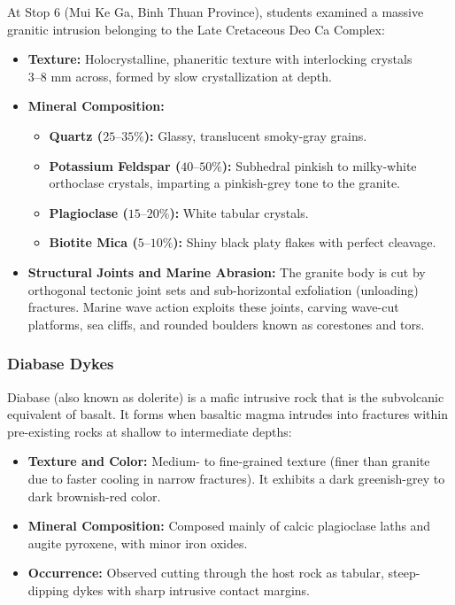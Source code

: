 \documentclass[11pt, a4paper]{article}
\begin{document}
At Stop 6 (Mui Ke Ga, Binh Thuan Province), students examined a massive granitic intrusion belonging to the Late Cretaceous Deo Ca Complex:
\begin{itemize}
    \item \textbf{Texture:} Holocrystalline, phaneritic texture with interlocking crystals $3\text{--}8\text{ mm}$ across, formed by slow crystallization at depth.
    \item \textbf{Mineral Composition:}
    \begin{itemize}
        \item \textbf{Quartz ($25\text{--}35\%$):} Glassy, translucent smoky-gray grains.
        \item \textbf{Potassium Feldspar ($40\text{--}50\%$):} Subhedral pinkish to milky-white orthoclase crystals, imparting a pinkish-grey tone to the granite.
        \item \textbf{Plagioclase ($15\text{--}20\%$):} White tabular crystals.
        \item \textbf{Biotite Mica ($5\text{--}10\%$):} Shiny black platy flakes with perfect cleavage.
    \end{itemize}
    \item \textbf{Structural Joints and Marine Abrasion:} The granite body is cut by orthogonal tectonic joint sets and sub-horizontal exfoliation (unloading) fractures. Marine wave action exploits these joints, carving wave-cut platforms, sea cliffs, and rounded boulders known as corestones and tors.
\end{itemize}

\subsubsection{Diabase Dykes}
\label{subsubsec:diabase}

Diabase (also known as dolerite) is a mafic intrusive rock that is the subvolcanic equivalent of basalt. It forms when basaltic magma intrudes into fractures within pre-existing rocks at shallow to intermediate depths:
\begin{itemize}
    \item \textbf{Texture and Color:} Medium- to fine-grained texture (finer than granite due to faster cooling in narrow fractures). It exhibits a dark greenish-grey to dark brownish-red color.
    \item \textbf{Mineral Composition:} Composed mainly of calcic plagioclase laths and augite pyroxene, with minor iron oxides.
    \item \textbf{Occurrence:} Observed cutting through the host rock as tabular, steep-dipping dykes with sharp intrusive contact margins.
\end{itemize}
\end{document}
